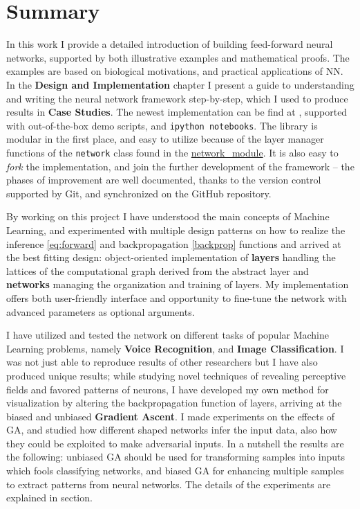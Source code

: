 \chapter{Summary}

In this work I provide a detailed introduction of building feed-forward neural networks, supported by both illustrative examples and mathematical proofs. 
The examples are based on biological motivations, and practical applications of NN. 
In the \textbf{Design and Implementation} chapter I present a guide to understanding and writing the neural network framework step-by-step, which I used to produce results in \textbf{Case Studies}. 
The newest implementation can be find at \cite{DV}, supported with out-of-the-box demo scripts, and \texttt{ipython notebooks}.
The library is modular in the first place, and easy to utilize because of the layer manager functions of the \texttt{network} class found in the \url{network_module}. 
It is also easy to \emph{fork} the implementation, and join the further development of the framework -- the phases of improvement are well documented, thanks to the version control supported by Git, and synchronized on the GitHub repository.

By working on this project I have understood the main concepts of Machine Learning, and experimented with multiple design patterns on how to realize the inference \ref{eq:forward} and backpropagation \ref{backprop} functions and arrived at the best fitting design: 
object-oriented implementation of \textbf{layers} handling the lattices of the computational graph derived from the abstract layer and \textbf{networks} managing the organization and training of layers.
My implementation offers both user-friendly interface and opportunity to fine-tune the network with advanced parameters as optional arguments.

I have utilized and tested the network on different tasks of popular Machine Learning problems, namely \textbf{Voice Recognition}, and \textbf{Image Classification}.
I was not just able to reproduce results of other researchers but I have also produced unique results;
while studying novel techniques of revealing perceptive fields and favored patterns of neurons, 
I have developed my own method for visualization by altering the backpropagation function of layers, arriving at the biased and unbiased \textbf{Gradient Ascent}.
I made experiments on the effects of GA, and studied how different shaped networks infer the input data, also how they could be exploited to make adversarial inputs. In a nutshell the results are the following: unbiased GA should be used for transforming samples into inputs which fools classifying networks, and biased GA for enhancing multiple samples to extract patterns from neural networks. The details of the experiments are explained in \textbf{} section.
